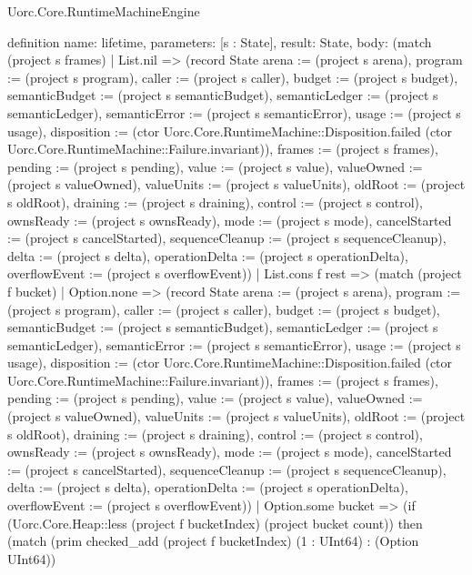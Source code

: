 \begin{lexlean}{Uorc.Core.RuntimeMachineEngine}
\begin{semanticmodule}
definition{
  name: lifetime,
  parameters: [s : State],
  result: State,
  body: (match (project s frames)
    | List.nil => (record State {arena := (project s arena), program := (project s program), caller := (project s caller), budget := (project s budget), semanticBudget := (project s semanticBudget), semanticLedger := (project s semanticLedger), semanticError := (project s semanticError), usage := (project s usage), disposition := (ctor Uorc.Core.RuntimeMachine::Disposition.failed (ctor Uorc.Core.RuntimeMachine::Failure.invariant)), frames := (project s frames), pending := (project s pending), value := (project s value), valueOwned := (project s valueOwned), valueUnits := (project s valueUnits), oldRoot := (project s oldRoot), draining := (project s draining), control := (project s control), ownsReady := (project s ownsReady), mode := (project s mode), cancelStarted := (project s cancelStarted), sequenceCleanup := (project s sequenceCleanup), delta := (project s delta), operationDelta := (project s operationDelta), overflowEvent := (project s overflowEvent)})
    | List.cons f rest => (match (project f bucket)
      | Option.none => (record State {arena := (project s arena), program := (project s program), caller := (project s caller), budget := (project s budget), semanticBudget := (project s semanticBudget), semanticLedger := (project s semanticLedger), semanticError := (project s semanticError), usage := (project s usage), disposition := (ctor Uorc.Core.RuntimeMachine::Disposition.failed (ctor Uorc.Core.RuntimeMachine::Failure.invariant)), frames := (project s frames), pending := (project s pending), value := (project s value), valueOwned := (project s valueOwned), valueUnits := (project s valueUnits), oldRoot := (project s oldRoot), draining := (project s draining), control := (project s control), ownsReady := (project s ownsReady), mode := (project s mode), cancelStarted := (project s cancelStarted), sequenceCleanup := (project s sequenceCleanup), delta := (project s delta), operationDelta := (project s operationDelta), overflowEvent := (project s overflowEvent)})
      | Option.some bucket => (if (Uorc.Core.Heap::less (project f bucketIndex) (project bucket count)) then (match (prim checked_add (project f bucketIndex) (1 : UInt64) : (Option UInt64))
}
\end{semanticmodule}
\end{lexlean}
